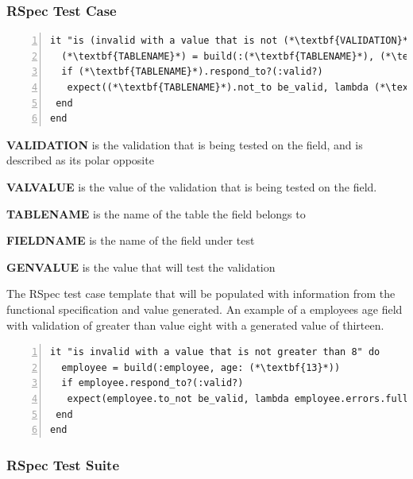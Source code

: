 \documentclass[a4paper,12pt]{article}
\begin{document}
\subsubsection{RSpec Test Case}
\begin{lstlisting}[frame=single,numbers=left,caption= {Pseudo code for value generation} label={psuedo:case}]
it "is (invalid with a value that is not (*\textbf{VALIDATION}*) (*\textbf{VALVALUE}*)" do
  (*\textbf{TABLENAME}*) = build(:(*\textbf{TABLENAME}*), (*\textbf{FIELDNAME}*): (*\textbf{GENVALUE}*)
  if (*\textbf{TABLENAME}*).respond_to?(:valid?)
   expect((*\textbf{TABLENAME}*).not_to be_valid, lambda (*\textbf{TABLENAME}*).errors.full_messages.join("\\n")
 end
end
\end{lstlisting}

\par \textbf{VALIDATION} is the validation that is being tested on the field, and is described as its polar opposite
\par \textbf{VALVALUE} is the value of the validation that is being tested on the field.
\par \textbf{TABLENAME} is the name of the table the field belongs to
\par \textbf{FIELDNAME} is the name of the field under test
\par \textbf{GENVALUE} is the value that will test the validation
\vspace{3mm}
\par The RSpec test case template that will be populated with information from the functional specification and value generated. An example of a employees age field with validation of greater than value eight with a generated value of thirteen.
\vspace{3mm}
\begin{lstlisting}[frame=single,numbers=left,caption= {Pseudo code for value generation output} label={psuedo:caseex}]
it "is invalid with a value that is not greater than 8" do
  employee = build(:employee, age: (*\textbf{13}*))
  if employee.respond_to?(:valid?)
   expect(employee.to_not be_valid, lambda employee.errors.full_messages.join("\\n")
 end
end
\end{lstlisting}

\subsubsection{RSpec Test Suite}
\end{document}
